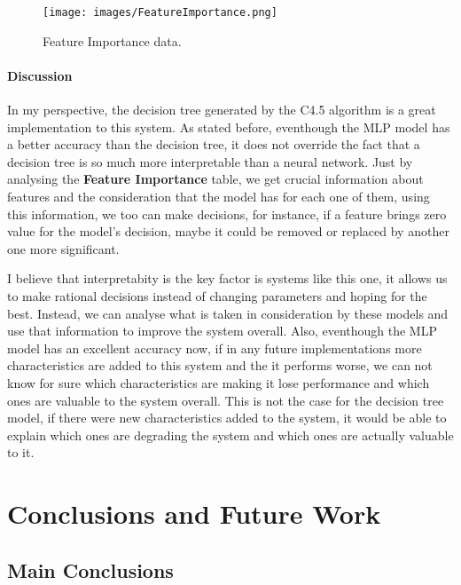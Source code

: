 \documentclass[12pt,a4paper,oneside]{memoir}
\begin{document}
\begin{figure}[H]
	\centering
	\texttt{[image: images/FeatureImportance.png]}
	\caption{Feature Importance data.}
	\centering
	\label{fig:accuracy_mlp}
\end{figure}

\subsubsection{Discussion}
In my perspective, the decision tree generated by the C4.5 algorithm is a great implementation to this system. As stated before, eventhough the \acs{MLP} model has a better accuracy than the decision tree, it does not override the fact that a decision tree is so much more interpretable than a neural network. Just by analysing the \textbf{Feature Importance} table, we get crucial information about features and the consideration that the model has for each one of them, using this information, we too can make decisions, for instance, if a feature brings zero value for the model's decision, maybe it could be removed or replaced by another one more significant.

\par

I believe that interpretabity is the key factor is systems like this one, it allows us to make rational decisions instead of changing parameters and hoping for the best. Instead, we can analyse what is taken in consideration by these models and use that information to improve the system overall. Also, eventhough the \acs{MLP} model has an excellent accuracy now, if in any future implementations more characteristics are added to this system and the it performs worse, we can not know for sure which characteristics are making it lose performance and which ones are valuable to the system overall. This is not the case for the decision tree model, if there were new characteristics added to the system, it would be able to explain which ones are degrading the system and which ones are actually valuable to it.



\clearpage{\thispagestyle{empty}\cleardoublepage}

\chapter{Conclusions and Future Work}

\section{Main Conclusions}
\end{document}
